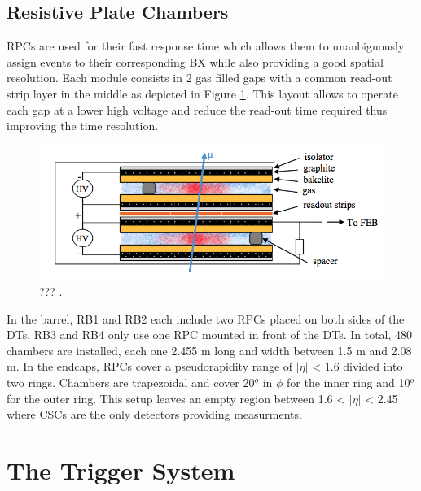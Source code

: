   	\subsection{Resistive Plate Chambers}

      RPCs are used for their fast response time which allows them to unanbiguously assign events to their corresponding BX while also providing a good spatial resolution. Each module consists in 2 gas filled gaps with a common read-out strip layer in the middle as depicted in Figure \ref{fig:I-3-rpc}. This layout allows to operate each gap at a lower high voltage and reduce the read-out time required thus improving the time resolution. \\

      \begin{figure}[h!]
        \centering
        \includegraphics[width=\textwidth]{img/I-3-cms/rpc.png}
        \caption{??? \cite{1748-0221-3-08-S08004}.}
        \label{fig:I-3-rpc}
      \end{figure}

      In the barrel, RB1 and RB2 each include two RPCs placed on both sides of the DTs. RB3 and RB4 only use one RPC mounted in front of the DTs. In total, 480 chambers are installed, each one 2.455 m long and width between 1.5 m and 2.08 m. In the endcaps, RPCs cover a pseudorapidity range of $ | \eta | $ < 1.6 divided into two rings. Chambers are trapezoidal and cover 20$^o$ in $ \phi $ for the inner ring and 10$^o$ for the outer ring. This setup leaves an empty region between 1.6 < $ | \eta | $ < 2.45 where CSCs are the only detectors providing measurments.

  \section{The Trigger System}

